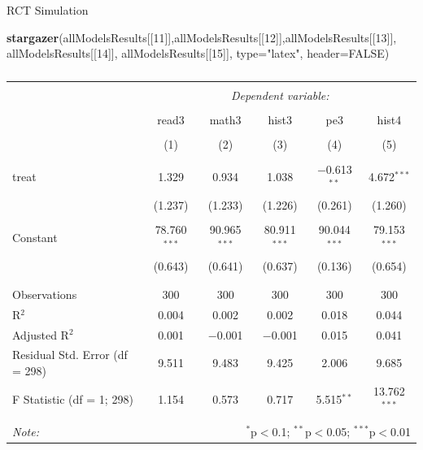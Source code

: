 \documentclass[
  ignorenonframetext,
]{beamer}
\newenvironment{Shaded}{\begin{snugshade}}{\end{snugshade}}
\newcommand{\DataTypeTok}[1]{\textcolor[rgb]{0.13,0.29,0.53}{#1}}
\newcommand{\DecValTok}[1]{\textcolor[rgb]{0.00,0.00,0.81}{#1}}
\newcommand{\KeywordTok}[1]{\textcolor[rgb]{0.13,0.29,0.53}{\textbf{#1}}}
\newcommand{\NormalTok}[1]{#1}
\newcommand{\OtherTok}[1]{\textcolor[rgb]{0.56,0.35,0.01}{#1}}
\newcommand{\StringTok}[1]{\textcolor[rgb]{0.31,0.60,0.02}{#1}}
\begin{document}
\begin{frame}[fragile]{RCT Simulation}
\protect\hypertarget{rct-simulation-9}{}
\tiny

\begin{Shaded}
\begin{Highlighting}[]
\KeywordTok{stargazer}\NormalTok{(allModelsResults[[}\DecValTok{11}\NormalTok{]],allModelsResults[[}\DecValTok{12}\NormalTok{]],allModelsResults[[}\DecValTok{13}\NormalTok{]],}
\NormalTok{          allModelsResults[[}\DecValTok{14}\NormalTok{]], allModelsResults[[}\DecValTok{15}\NormalTok{]], }\DataTypeTok{type=}\StringTok{"latex"}\NormalTok{, }\DataTypeTok{header=}\OtherTok{FALSE}\NormalTok{)}
\end{Highlighting}
\end{Shaded}

\begin{table}[!htbp] \centering 
  \caption{} 
  \label{} 
\begin{tabular}{@{\extracolsep{5pt}}lccccc} 
\\[-1.8ex]\hline 
\hline \\[-1.8ex] 
 & \multicolumn{5}{c}{\textit{Dependent variable:}} \\ 
\cline{2-6} 
\\[-1.8ex] & read3 & math3 & hist3 & pe3 & hist4 \\ 
\\[-1.8ex] & (1) & (2) & (3) & (4) & (5)\\ 
\hline \\[-1.8ex] 
 treat & 1.329 & 0.934 & 1.038 & $-$0.613$^{**}$ & 4.672$^{***}$ \\ 
  & (1.237) & (1.233) & (1.226) & (0.261) & (1.260) \\ 
  & & & & & \\ 
 Constant & 78.760$^{***}$ & 90.965$^{***}$ & 80.911$^{***}$ & 90.044$^{***}$ & 79.153$^{***}$ \\ 
  & (0.643) & (0.641) & (0.637) & (0.136) & (0.654) \\ 
  & & & & & \\ 
\hline \\[-1.8ex] 
Observations & 300 & 300 & 300 & 300 & 300 \\ 
R$^{2}$ & 0.004 & 0.002 & 0.002 & 0.018 & 0.044 \\ 
Adjusted R$^{2}$ & 0.001 & $-$0.001 & $-$0.001 & 0.015 & 0.041 \\ 
Residual Std. Error (df = 298) & 9.511 & 9.483 & 9.425 & 2.006 & 9.685 \\ 
F Statistic (df = 1; 298) & 1.154 & 0.573 & 0.717 & 5.515$^{**}$ & 13.762$^{***}$ \\ 
\hline 
\hline \\[-1.8ex] 
\textit{Note:}  & \multicolumn{5}{r}{$^{*}$p$<$0.1; $^{**}$p$<$0.05; $^{***}$p$<$0.01} \\ 
\end{tabular} 
\end{table}
\end{frame}
\end{document}
